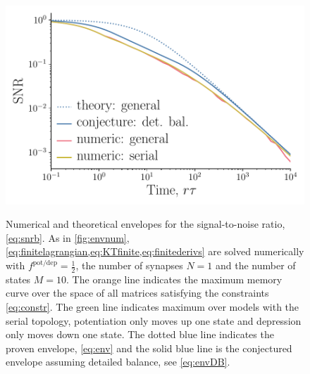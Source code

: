 \documentclass[12pt]{article}
\newcommand{\potdep}{^{\text{pot/dep}}}
\begin{document}
\begin{figure}[tb]
  \centering
  \includegraphics[width=0.8\linewidth]{LenvNum.pdf}\\
  \caption[Numerical and theoretical envelopes for the signal-to-noise ratio]
  {Numerical  and theoretical envelopes  for the signal-to-noise ratio, \eqref{eq:snrb}. 
  As in \cref{fig:envnum}, \cref{eq:finitelagrangian,eq:KTfinite,eq:finitederivs} 
  are solved numerically with \(f\potdep=\frac{1}{2}\), 
  the number of synapses \(N=1\) and the number of states \(M=10\).
  The orange line indicates the maximum memory curve over the space of all matrices 
  satisfying the constraints \eqref{eq:constr}.
  The green line indicates maximum over models with the serial topology, 
  \ie potentiation only moves up one state and depression only moves down one state.
  The dotted blue line indicates the proven envelope, 
  \cref{eq:env} and the solid blue line is the conjectured envelope assuming detailed balance, 
  see \cref{eq:envDB}.}\label{fig:envnumth}
\end{figure}
\end{document}
